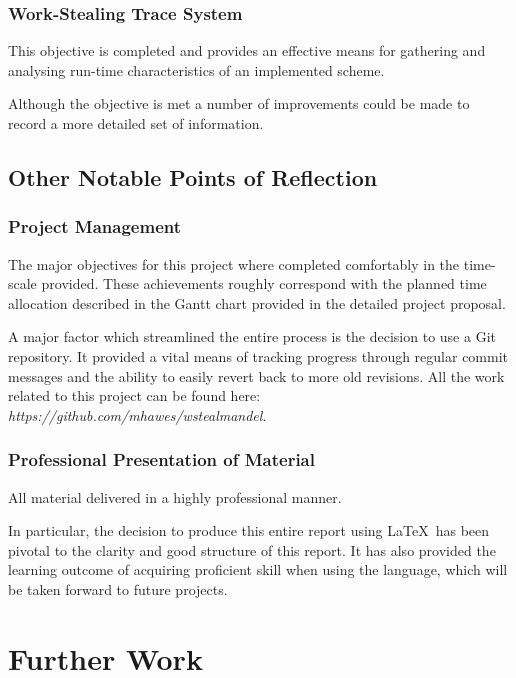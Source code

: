 \subsubsection*{Work-Stealing Trace System}
    This objective is completed and provides an effective means for gathering 
    and analysing run-time characteristics of an implemented scheme.
    
    Although the objective is met a number of improvements could be made to record 
    a more detailed set of information. 

\subsection{Other Notable Points of Reflection}
\subsubsection*{Project Management}
    The major objectives for this project where completed comfortably in the time-scale provided.
    These achievements roughly correspond with the planned time allocation described in the Gantt chart
    provided in the detailed project proposal.
    
    A major factor which streamlined the entire process is the decision to use a Git repository.
    It provided a vital means of tracking progress through regular commit messages and the ability
    to easily revert back to more old revisions. All the work related to this project can be found 
    here: \textit{https://github.com/mhawes/wstealmandel}.

\subsubsection*{Professional Presentation of Material}
    All material delivered in a highly professional manner.
    
    In particular, the decision to produce this entire report using \LaTeX~has been pivotal
    to the clarity and good structure of this report. It has also provided the learning outcome 
    of acquiring proficient skill when using the language, which will be taken forward to future projects.

\section{Further Work}

